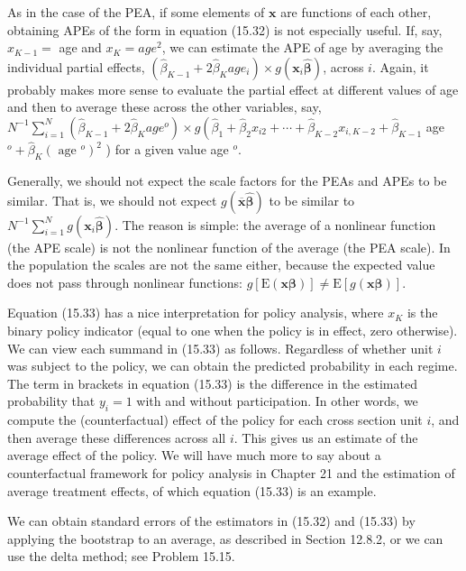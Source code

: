 \documentclass[10pt]{article}
\begin{document}
As in the case of the PEA, if some elements of $\mathbf{x}$ are functions of each other, obtaining APEs of the form in equation (15.32) is not especially useful. If, say, $x_{K-1}=$ age and $x_{K}=a g e^{2}$, we can estimate the APE of age by averaging the individual partial effects, $\left(\hat{\beta}_{K-1}+2 \hat{\beta}_{K} a g e_{i}\right) \times g\left(\mathbf{x}_{i} \hat{\boldsymbol{\beta}}\right)$, across $i$. Again, it probably makes more sense to evaluate the partial effect at different values of age and then to average these across the other variables, say, $N^{-1} \sum_{i=1}^{N}\left(\hat{\beta}_{K-1}+2 \hat{\beta}_{K} a g e^{o}\right) \times g\left(\hat{\beta}_{1}+\hat{\beta}_{2} x_{i 2}\right. +\cdots+\hat{\beta}_{K-2} x_{i, K-2}+\hat{\beta}_{K-1}$ age $^{o}+\hat{\beta}_{K}\left(\text { age }^{o}\right)^{2}$ ) for a given value age $^{o}$.

Generally, we should not expect the scale factors for the PEAs and APEs to be similar. That is, we should not expect $g(\overline{\mathbf{x}} \hat{\boldsymbol{\beta}})$ to be similar to $N^{-1} \sum_{i=1}^{N} g\left(\mathbf{x}_{i} \hat{\boldsymbol{\beta}}\right)$. The reason is simple: the average of a nonlinear function (the APE scale) is not the nonlinear function of the average (the PEA scale). In the population the scales are not the same either, because the expected value does not pass through nonlinear functions: $g[\mathrm{E}(\mathbf{x} \boldsymbol{\beta})] \neq \mathrm{E}[g(\mathbf{x} \boldsymbol{\beta})]$.

Equation (15.33) has a nice interpretation for policy analysis, where $x_{K}$ is the binary policy indicator (equal to one when the policy is in effect, zero otherwise). We can view each summand in (15.33) as follows. Regardless of whether unit $i$ was subject to the policy, we can obtain the predicted probability in each regime. The term in brackets in equation (15.33) is the difference in the estimated probability that $y_{i}=1$ with and without participation. In other words, we compute the (counterfactual) effect of the policy for each cross section unit $i$, and then average these differences across all $i$. This gives us an estimate of the average effect of the policy. We will have much more to say about a counterfactual framework for policy analysis in Chapter 21 and the estimation of average treatment effects, of which equation (15.33) is an example.

We can obtain standard errors of the estimators in (15.32) and (15.33) by applying the bootstrap to an average, as described in Section 12.8.2, or we can use the delta method; see Problem 15.15.
\end{document}
